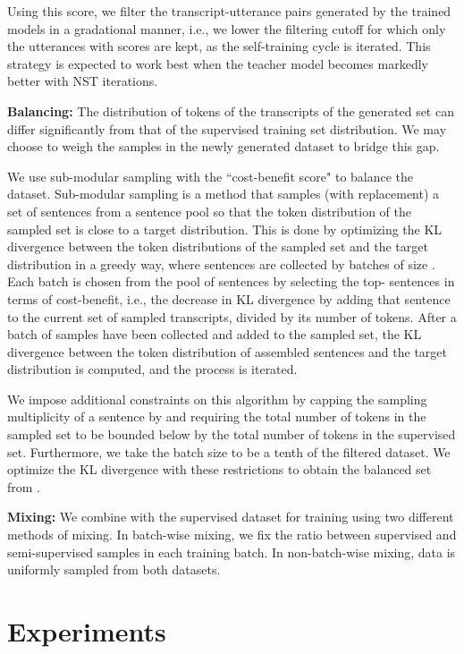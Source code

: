 \documentclass[a4paper]{article}
\begin{document}
Using this score, we filter the transcript-utterance pairs generated by the trained models in a gradational manner, i.e., we lower the filtering cutoff  for which only the utterances with scores  are kept, as the self-training cycle is iterated. This strategy is expected to work best when the teacher model becomes markedly better with NST iterations.
\smallskip

\noindent\textbf{Balancing: }
The distribution of tokens of the transcripts of the generated set  can differ significantly from that of the supervised training set distribution. We may choose to weigh the samples in the newly generated dataset to bridge this gap.

We use sub-modular sampling \cite{shinohara2014} with the ``cost-benefit score" to balance the dataset. Sub-modular sampling is a method that samples (with replacement) a set of sentences from a sentence pool so that the token distribution of the sampled set is close to a target distribution. This is done by optimizing the KL divergence between the token distributions of the sampled set and the target distribution in a greedy way, where sentences are collected by batches of size . Each batch is chosen from the pool of sentences by selecting the top- sentences in terms of cost-benefit, i.e., the decrease in KL divergence by adding that sentence to the current set of sampled transcripts, divided by its number of tokens. After a batch of samples have been collected and added to the sampled set, the KL divergence between the token distribution of assembled sentences and the target distribution is computed, and the process is iterated.

We impose additional constraints on this algorithm by capping the sampling multiplicity of a sentence by   and requiring the total number of tokens in the sampled set to be bounded below by the total number of tokens in the supervised set. Furthermore, we take the batch size to be a tenth of the filtered dataset. We optimize the KL divergence with these restrictions to obtain the balanced set  from .
\smallskip

\noindent\textbf{Mixing: }
We combine   with the supervised dataset  for training using two different methods of mixing. In batch-wise mixing, we fix the ratio between supervised and semi-supervised samples in each training batch. In non-batch-wise mixing, data is uniformly sampled from both datasets.

\section{Experiments}
\end{document}
